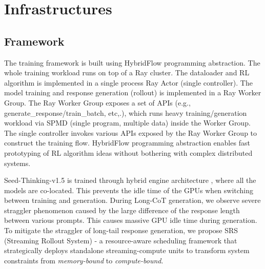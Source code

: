 \section{Infrastructures}


\subsection{Framework}
The training framework is built using HybridFlow \cite{sheng2024hybridflow} programming abstraction. The whole training workload runs on top of a Ray \cite{ray} cluster. The dataloader and RL algorithm is implemented in a single process Ray Actor (single controller). The model training and response generation (rollout) is implemented in a Ray Worker Group. The Ray Worker Group exposes a set of APIs (e.g., generate\_response/train\_batch, etc,.), which runs heavy training/generation workload via SPMD (single program, multiple data) inside the Worker Group. The single controller invokes various APIs exposed by the Ray Worker Group to construct the training flow. HybridFlow programming abstraction enables fast prototyping of RL algorithm ideas without bothering with complex distributed systems.

Seed-Thinking-v1.5 is trained through hybrid engine architecture \cite{yao2023deepspeedchateasyfastaffordable}, where all the models are co-located. This prevents the idle time of the GPUs when switching between training and generation. During Long-CoT generation, we observe severe straggler phenomenon caused by the large difference of the response length between various prompts. This causes massive GPU idle time during generation. To mitigate the straggler of long-tail response generation, we propose SRS (Streaming Rollout System) - a resource-aware scheduling framework that strategically deploys standalone streaming-compute units to transform system constraints from \textit{memory-bound} to \textit{compute-bound}.

